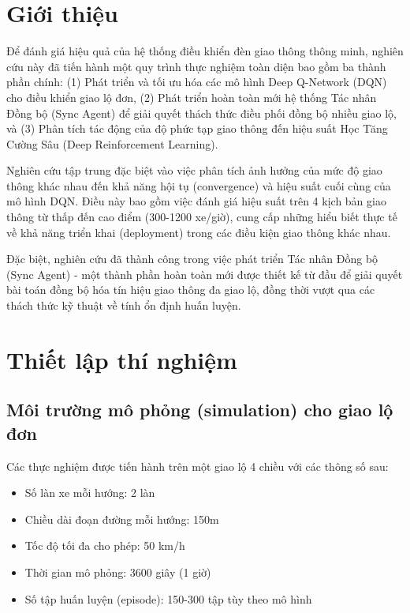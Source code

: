 \section{Giới thiệu}

Để đánh giá hiệu quả của hệ thống điều khiển đèn giao thông thông minh, nghiên
cứu này đã tiến hành một quy trình thực nghiệm toàn diện bao gồm ba thành phần
chính: (1) Phát triển và tối ưu hóa các mô hình Deep Q-Network (DQN) cho điều khiển
giao lộ đơn, (2) Phát triển hoàn toàn mới hệ thống Tác nhân Đồng bộ (Sync Agent) để giải quyết
thách thức điều phối đồng bộ nhiều giao lộ, và (3) Phân tích tác động của độ phức tạp
giao thông đến hiệu suất Học Tăng Cường Sâu (Deep Reinforcement Learning).

Nghiên cứu tập trung đặc biệt vào việc phân tích ảnh hưởng của mức độ giao thông khác nhau
đến khả năng hội tụ (convergence) và hiệu suất cuối cùng của mô hình DQN. Điều này bao gồm việc đánh giá
hiệu suất trên 4 kịch bản giao thông từ thấp đến cao điểm (300-1200 xe/giờ), cung cấp
những hiểu biết thực tế về khả năng triển khai (deployment) trong các điều kiện giao thông khác nhau.

Đặc biệt, nghiên cứu đã thành công trong việc phát triển Tác nhân Đồng bộ (Sync Agent) - một thành phần hoàn toàn
mới được thiết kế từ đầu để giải quyết bài toán đồng bộ hóa tín hiệu giao thông
đa giao lộ, đồng thời vượt qua các thách thức kỹ thuật về tính ổn định huấn luyện.

\section{Thiết lập thí nghiệm}

\subsection{Môi trường mô phỏng (simulation) cho giao lộ đơn}
Các thực nghiệm được tiến hành trên một giao lộ 4 chiều với các thông số sau:
\begin{itemize}
    \item Số làn xe mỗi hướng: 2 làn

    \item Chiều dài đoạn đường mỗi hướng: 150m

    \item Tốc độ tối đa cho phép: 50 km/h

    \item Thời gian mô phỏng: 3600 giây (1 giờ)

    \item Số tập huấn luyện (episode): 150-300 tập tùy theo mô hình
\end{itemize}

